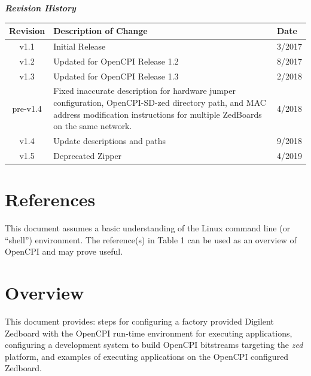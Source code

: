 	\begin{center}
	\textit{\textbf{Revision History}}
		\begin{table}[H]
		\label{table:revisions} %
			\begin{tabularx}{\textwidth}{|c|X|l|}
			\hline
			\rowcolor{blue}
			\textbf{Revision} & \textbf{Description of Change} & \textbf{Date} \\
		    \hline
		    v1.1 & Initial Release & 3/2017 \\
				\hline
				v1.2 & Updated for OpenCPI Release 1.2 & 8/2017 \\
				\hline
				v1.3 & Updated for OpenCPI Release 1.3 & 2/2018 \\
				\hline
				pre-v1.4 & Fixed inaccurate description for hardware jumper configuration, OpenCPI-SD-zed directory path, and MAC address modification instructions for multiple ZedBoards on the same network. & 4/2018 \\
				\hline
				v1.4 & Update descriptions and paths & 9/2018 \\
				\hline
				v1.5 & Deprecated Zipper & 4/2019 \\
				\hline
			\end{tabularx}
		\end{table}
	\end{center}

\newpage

\tableofcontents

\newpage

\section{References}
	This document assumes a basic understanding of the Linux command line (or ``shell'') environment.  The reference(s) in Table 1 can be used as an overview of OpenCPI and may prove useful.
\def\refskipocpiov{}
\def\refcapbottom{}


\newpage
\section{Overview}
This document provides: steps for configuring a factory provided Digilent Zedboard with the OpenCPI run-time environment for executing applications, configuring a development system to build OpenCPI bitstreams targeting the \textit{zed} platform, and examples of executing applications on the OpenCPI configured Zedboard.

